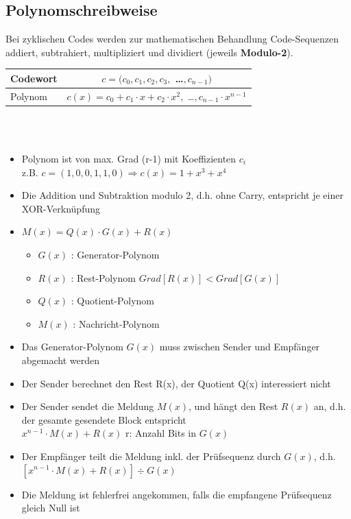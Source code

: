 \subsection{Polynomschreibweise}
Bei zyklischen Codes werden zur mathematischen Behandlung Code-Sequenzen addiert, subtrahiert, multipliziert und dividiert (jeweils \textbf{Modulo-2}).\\

\begin{tabular}{|l|c|}
\hline Codewort  & $c = (c_0, c_1, c_2, c_3,$ \dots $, c_{n-1})$ \\ 
\hline Polynom &  $c(x) = c_0 + c_1 \cdot x + c_2 \cdot x^2,$ \dots $, c_{n-1} \cdot x^{n-1}$\\ 
\hline 
\end{tabular} \\ \\

\begin{itemize}
	\item Polynom ist von max. Grad (r-1) mit Koeffizienten $c_i$\\
		z.B. $c = (1, 0, 0, 1, 1, 0) \Rightarrow c(x) = 1 + x^3 + x^4$
	\item Die Addition und Subtraktion modulo 2, d.h. ohne Carry, entspricht je einer XOR-Verknüpfung
	\item $M(x) = Q(x) \cdot G(x) + R(x)$
	\begin{itemize}
		\item $G(x)$ : Generator-Polynom
		\item $R(x)$ : Rest-Polynom \qquad $Grad[R(x)] < Grad[G(x)]$
		\item $Q(x)$ : Quotient-Polynom
		\item $M(x)$ : Nachricht-Polynom
	\end{itemize}
	\item Das Generator-Polynom $G(x)$ muss zwischen Sender und Empfänger abgemacht werden
	\item Der Sender berechnet den Rest R(x), der Quotient Q(x) interessiert nicht
	\item Der Sender sendet die Meldung $M(x)$, und hängt den Rest $R(x)$ an, d.h. der gesamte gesendete Block entspricht\\
		$x^{n-1} \cdot M(x) + R(x)$ \qquad	r: Anzahl Bits in $G(x)$
	\item Der Empfänger teilt die Meldung inkl. der Prüfsequenz durch $G(x)$, d.h.
		$[x^{n-1} \cdot M(x) + R(x)] \div G(x)$
	\item Die Meldung ist fehlerfrei angekommen, falls die empfangene Prüfsequenz gleich Null ist
\end{itemize}

